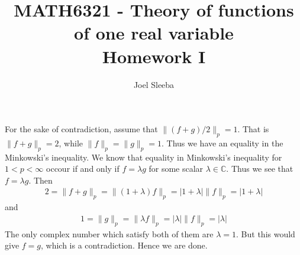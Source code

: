 \documentclass[12pt]{exam}
\theoremstyle{plain} %
\theoremstyle{definition} %
\theoremstyle{remark} %
\begin{document}
\title{MATH6321 - Theory of functions of one real variable \\ Homework  I}

\author{
  Joel Sleeba \\
}

\maketitle
\printanswers
\unframedsolutions

\begin{questions}

  \question
  \begin{solution}
    For the sake of contradiction, assume that $\|(f + g)/2\|_p = 1$.
    That is $\|f + g\|_p = 2$, while $ \|f\|_p = \|g\|_p = 1$. Thus
    we have an equality in the Minkowski's inequality.
    We know that equality in Minkowski's inequality for $1 < p <
    \infty$ occour if and only if $ f = \lambda g$ for some scalar
    $\lambda \in \mathbb{C}$. Thus we see that $f = \lambda g$.
    Then
    \begin{align*}
      2 = \|f + g\|_p = \|(1 + \lambda)f\|_p = |1 + \lambda|\|f\|_p =
      |1 + \lambda|
    \end{align*}
    and
    \begin{align*}
      1 = \|g\|_p = \|\lambda f\|_p = |\lambda|\|f\|_p = |\lambda|
    \end{align*}
    The only complex number which satisfy both of them are $\lambda =
    1$. But this would give $f = g$, which is a contradiction. Hence
    we are done.
  \end{solution}


\end{questions}
\end{document}
